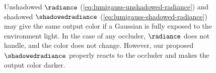 {{{
      }
    }
}

\begin{figure}[!t]
  \centering
  \shadowedunshadowed
  \caption[A simple visualization of how \lumigauss handles occluders to produce shadows]{
    Unshadowed $\radiance$ (\cref{eq:lumigauss-unshadowed-radiance}) and
    shadowed $\shadowedradiance$ (\cref{eq:lumigauss-shadowed-radiance}) may
    give the same output color if a Gaussian is fully exposed to the
    environment light.
    In the case of any occluder, $\radiance$ does not handle, and the color does
    not change.
    However, our proposed $\shadowedradiance$ properly reacts to the occluder and
    makes the output color darker.
  }

  \label{fig:lumigauss-shadowed_unshadowed}
\end{figure}